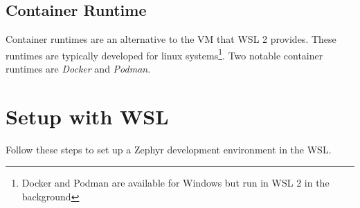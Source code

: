 \subsection{Container Runtime}
Container runtimes are an alternative to the VM that WSL 2 provides. These
runtimes are typically developed for linux systems\footnote{Docker and Podman
  are available for Windows but run in WSL 2 in the background}. Two notable
container runtimes are \emph{Docker} and \emph{Podman}.

\newpage

\section{Setup with WSL}

Follow these steps to set up a Zephyr development environment in the WSL.

